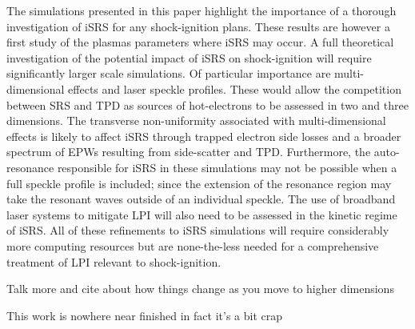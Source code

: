 The simulations presented in this paper highlight the importance of a thorough investigation of iSRS for any shock-ignition
plans. These results are however a first study of the plasmas parameters where iSRS may occur. A full theoretical
investigation of the potential impact of iSRS on shock-ignition will require significantly larger scale simulations. Of
particular importance are multi-dimensional effects and laser speckle profiles. These would allow the competition between
SRS and TPD as sources of hot-electrons to be assessed in two and three dimensions. The transverse non-uniformity associated with
multi-dimensional effects is likely to affect iSRS through trapped electron side losses and a broader spectrum of EPWs
resulting from side-scatter and TPD.
Furthermore, the auto-resonance responsible for iSRS in these simulations may not be
possible when a full speckle profile is included; since the extension of the resonance region may take the
resonant waves outside of an individual speckle. The use of broadband
laser systems to mitigate LPI will also need to be assessed
in the kinetic regime of iSRS.
All of these refinements to iSRS simulations will require considerably more
computing resources but are none-the-less needed for a comprehensive treatment of LPI relevant
to shock-ignition.

Talk more and cite about how things change as you move to higher dimensions

This work is nowhere near finished in fact it's a bit crap

%
